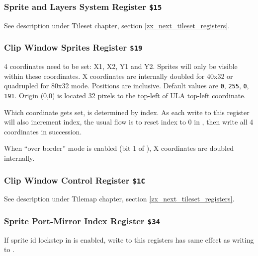 \documentclass[12pt,twoside,openright,a4paper]{book}
\begin{document}
\subsubsection{Sprite and Layers System Register {\tt \$15}}

See description under Tileset chapter, section \ref{zx_next_tileset_registers}.


\subsubsection{Clip Window Sprites Register {\tt \$19}}

\begin{NextPort}
\end{NextPort}

4 coordinates need to be set: X1, X2, Y1 and Y2. Sprites will only be visible within these coordinates. X coordinates are internally doubled for 40x32 or quadrupled for 80x32 mode. Positions are inclusive. Default values are {\tt 0}, {\tt 255}, {\tt 0}, {\tt 191}. Origin (0,0) is located 32 pixels to the top-left of ULA top-left coordinate.

Which coordinate gets set, is determined by index. As each write to this register will also increment index, the usual flow is to reset index to 0 in , then write all 4 coordinates in succession.

When ``over border'' mode is enabled (bit 1 of ), X coordinates are doubled internally.


\subsubsection{Clip Window Control Register {\tt \$1C}}
\vspace*{-2ex}
See description under Tilemap chapter, section \ref{zx_next_tileset_registers}.


\subsubsection{Sprite Port-Mirror Index Register {\tt \$34}}

If sprite id lockstep in  is enabled, write to this registers has same effect as writing to .

\begin{NextPort}
\end{NextPort}
\end{document}
